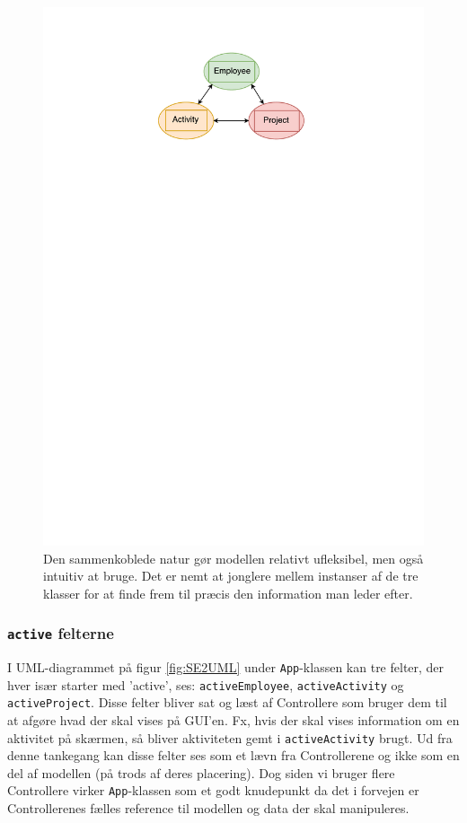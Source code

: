 \begin{figure}[H]
    \centering
    \includegraphics[scale = 0.8]{Figurer/treenighed}
    \caption{Den sammenkoblede natur gør modellen relativt ufleksibel, men også intuitiv at bruge. Det er nemt at jonglere mellem instanser af de tre klasser for at finde frem til præcis den information man leder efter. }
    \label{fig:treenighed}
\end{figure}

\subsubsection{\texttt{active} felterne}
\label{activefelter}
I UML-diagrammet på figur \ref{fig:SE2UML} under \texttt{App}-klassen kan tre felter, der hver især starter med 'active', ses: \texttt{activeEmployee}, \texttt{activeActivity} og \texttt{activeProject}. Disse felter bliver sat og læst af Controllere som bruger dem til at afgøre hvad der skal vises på GUI'en.
Fx, hvis der skal vises information om en aktivitet på skærmen, så bliver aktiviteten gemt i \texttt{activeActivity} brugt. Ud fra denne tankegang kan disse felter ses som et lævn fra Controllerene og ikke som en del af modellen (på trods af deres placering). Dog siden vi bruger flere Controllere virker \texttt{App}-klassen som et godt knudepunkt da det i forvejen er Controllerenes fælles reference til modellen og data der skal manipuleres.

